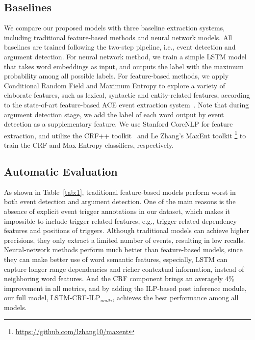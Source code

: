 \subsection{Baselines}
We compare our proposed models with three baseline extraction systems, including traditional feature-based methods and neural network models. All baselines are trained following the two-step pipeline, i.e., event detection and argument detection.
For neural network method, we train a simple LSTM model that takes word embeddings as input, and outputs the label with the maximum probability among all possible labels. 
For feature-based methods, we apply Conditional Random Field \cite{lafferty2001conditional} and Maximum Entropy \cite{berger1996maximum} to explore a variety of elaborate features, such as lexical, syntactic and entity-related features, according to the state-of-art feature-based ACE event extraction system~\cite{li2013joint}. Note that during argument detection stage, we add the label of each word output by event detection as a supplementary feature.
We use Stanford CoreNLP \cite{manning2014stanford} for feature extraction, and utilize the CRF++ toolkit~\cite{kudo2005crf++} and Le Zhang's MaxEnt toolkit \footnote{\url{https://github.com/lzhang10/maxent}} to train the CRF and Max Entropy classifiers, respectively.

\subsection{Automatic Evaluation}
As shown in Table~\ref{tab:1}, traditional feature-based models perform worst in both event detection and argument detection. 
One of the main reasons is the absence of explicit event trigger annotations in our dataset, which makes it impossible to include trigger-related features, e.g., trigger-related dependency features and positions of triggers. 
Although traditional models can achieve higher precisions, they only extract a limited number of events, resulting in low recalls. 
Neural-network methods perform much better than feature-based models, since they can make better use of word semantic features, especially, LSTM can capture longer range dependencies and richer contextual information, instead of neighboring word features.
And the CRF component brings an averagely 4\% improvement in all metrics, and by adding the ILP-based post inference module, our full model, LSTM-CRF-ILP$_{multi}$, achieves the best performance among all models. 


